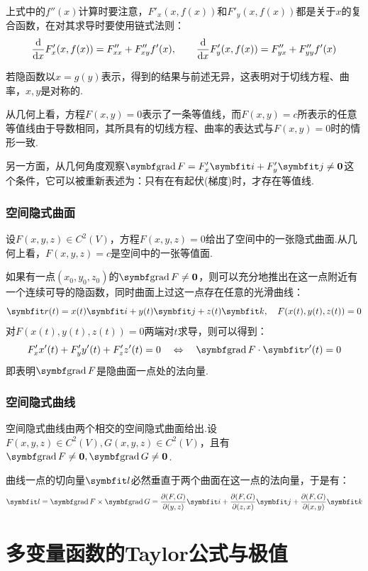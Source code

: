 \begin{mistake}
    上式中的$f''(x)$计算时要注意，$F'_x(x,f(x))$和$F'_y(x,f(x))$都是关于$x$的复合函数，在对其求导时要使用链式法则：
    \[\dv{x}F'_x(x,f(x)) = F''_{xx} + F''_{xy}f'(x),\qquad \dv{x}F'_y(x,f(x)) = F''_{yx} + F''_{yy}f'(x)\]
\end{mistake}

若隐函数以$x = g(y)$表示，得到的结果与前述无异，这表明对于切线方程、曲率，$x,y$是对称的.

从几何上看，方程$F(x,y) = 0$表示了一条等值线，而$F(x,y) = c$所表示的任意等值线由于导数相同，其所具有的切线方程、曲率的表达式与$F(x,y) = 0$时的情形一致.

另一方面，从几何角度观察$\grad F = F'_x\vb{i} + F'_y\vb{j} \neq \bm{0}$这个条件，它可以被重新表述为：只有在有起伏(梯度)时，才存在等值线.


\subsubsection{空间隐式曲面}
设$F(x,y,z) \in C^2(V)$，方程$F(x,y,z) = 0$给出了空间中的一张隐式曲面.从几何上看，$F(x,y,z) = c$是空间中的一张等值面.

如果有一点$(x_0,y_0,z_0)$的$\grad F \neq \bm{0}$，则可以充分地推出在这一点附近有一个连续可导的隐函数，同时曲面上过这一点存在任意的光滑曲线：
\[\vb{r}(t) = x(t)\vb{i} + y(t)\vb{j} + z(t)\vb{k},\quad F(x(t),y(t),z(t)) = 0\]
对$F(x(t),y(t),z(t)) = 0$两端对$t$求导，则可以得到：
\[F'_x x'(t) + F'_y y'(t) + F'_z z'(t) = 0 \quad\Leftrightarrow\quad \grad{F}\cdot\vb{r}'(t) = 0\]
即表明$\grad F$是隐曲面一点处的法向量.


\subsubsection{空间隐式曲线}
空间隐式曲线由两个相交的空间隐式曲面给出.设$F(x,y,z) \in C^2(V),G(x,y,z) \in C^2(V)$，且有$\grad F \neq \bm{0},\grad G \neq \bm{0}$.

曲线一点的切向量$\vb{l}$必然垂直于两个曲面在这一点的法向量，于是有：
\[\vb{l} = \grad F \times \grad G = \pdv{(F,G)}{(y,z)}\vb{i} + \pdv{(F,G)}{(z,x)}\vb{j} + \pdv{(F,G)}{(x,y)}\vb{k}\]


\section{多变量函数的Taylor公式与极值}

